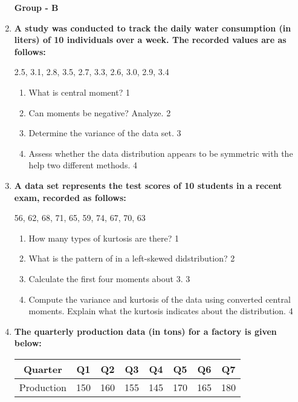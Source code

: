 \documentclass{article}
\begin{document}
\begin{enumerate}
\newpage
 
  \begin{center}
\textbf{Group  - B}
\end{center}
  
  \item
\textbf{A study was conducted to track the daily water consumption (in liters) 
of 10 individuals over a week. The recorded values are as follows:}

\begin{center}
2.5, 3.1, 2.8, 3.5, 2.7, 3.3, 2.6, 3.0, 2.9, 3.4
\end{center}

\begin{enumerate}

  \item What is central moment? \hfill 1
 \item Can moments be negative? Analyze. \hfill 2
\item
Determine the variance of the data set. \hfill 3
\item
Assess whether the data distribution appears to be symmetric with the help
two different methods. \hfill 4
\end{enumerate}

  \item
\textbf{A data set represents the test scores of 10 students in a recent 
exam, recorded as follows:}

\begin{center}
56, 62, 68, 71, 65, 59, 74, 67, 70, 63
\end{center}

    \begin{enumerate}
    \item How many types of kurtosis are there? \hfill 1
    \item What is the pattern of in a left-skewed didstribution? \hfill 2
\item
Calculate the first four moments about 3. \hfill 3
\item
Compute the variance and kurtosis of the data using converted central moments. 
Explain what the kurtosis indicates about the distribution. \hfill 4
\end{enumerate}

\item
\textbf{The quarterly production data (in tons) for a factory is given below:}

\begin{table}[h]
\centering
\begin{tabular}{cccccccc}
Quarter    & Q1     & Q2     & Q3     & Q4     & Q5     & Q6     & Q7     \\ \hline
Production & 150    & 160    & 155    & 145    & 170    & 165    & 180    \\
\end{tabular}
\end{table}


\end{enumerate}
\end{document}
